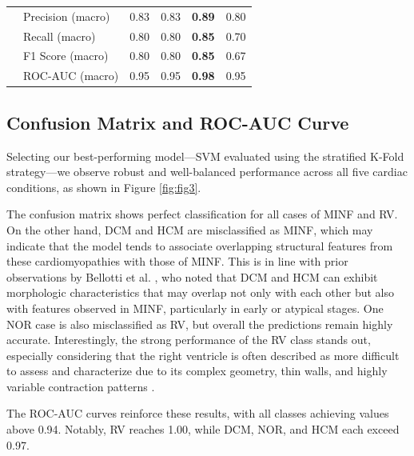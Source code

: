 \begin{table}[H]
\begin{adjustbox}{max width=0.99\textwidth}
\begin{tabular}{llcccc}
			               & Precision (macro)  & 0.83              & 0.83                       & \textbf{0.89}              & 0.80              \\
			               & Recall (macro)     & 0.80              & 0.80                       & \textbf{0.85}              & 0.70              \\
			               & F1 Score (macro)   & 0.80              & 0.80                       & \textbf{0.85}              & 0.67              \\
			               & ROC-AUC (macro)    & 0.95              & 0.95                       & \textbf{0.98}              & 0.95              \\
			\bottomrule
		\end{tabular}
	\end{adjustbox}
\end{table}

\subsection{Confusion Matrix and ROC-AUC Curve}

Selecting our best-performing model—SVM evaluated using the stratified K-Fold
strategy—we observe robust and well-balanced performance across all five
cardiac conditions, as shown in Figure \ref{fig:fig3}.

The confusion matrix shows perfect classification for all cases of MINF and RV.
On the other hand, DCM and HCM are misclassified as MINF, which may indicate
that the model tends to associate overlapping structural features from these
cardiomyopathies with those of MINF. This is in line with prior observations by
Bellotti et al. \cite{bellotti2002}, who noted that DCM and HCM can exhibit
morphologic characteristics that may overlap not only with each other but also
with features observed in MINF, particularly in early or atypical stages. One
NOR case is also misclassified as RV, but overall the predictions remain highly
accurate. Interestingly, the strong performance of the RV class stands out,
especially considering that the right ventricle is often described as more
difficult to assess and characterize due to its complex geometry, thin walls,
and highly variable contraction patterns \cite{sievers2014}.

The ROC-AUC curves reinforce these results, with all classes achieving values
above 0.94. Notably, RV reaches 1.00, while DCM, NOR, and HCM each exceed 0.97.

